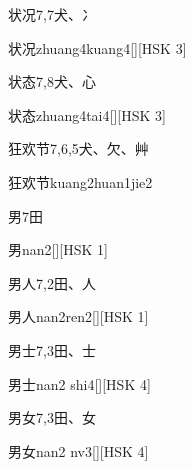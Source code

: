 \begin{entry}{状况}{7,7}{⽝、⼎}
  \begin{phonetics}{状况}{zhuang4kuang4}[][HSK 3]
  \end{phonetics}
\end{entry}

\begin{entry}{状态}{7,8}{⽝、⼼}
  \begin{phonetics}{状态}{zhuang4tai4}[][HSK 3]
  \end{phonetics}
\end{entry}

\begin{entry}{狂欢节}{7,6,5}{⽝、⽋、⾋}
  \begin{phonetics}{狂欢节}{kuang2huan1jie2}
  \end{phonetics}
\end{entry}

\begin{entry}{男}{7}{⽥}
  \begin{phonetics}{男}{nan2}[][HSK 1]
  \end{phonetics}
\end{entry}

\begin{entry}{男人}{7,2}{⽥、⼈}
  \begin{phonetics}{男人}{nan2ren2}[][HSK 1]
  \end{phonetics}
\end{entry}

\begin{entry}{男士}{7,3}{⽥、⼠}
  \begin{phonetics}{男士}{nan2 shi4}[][HSK 4]
  \end{phonetics}
\end{entry}

\begin{entry}{男女}{7,3}{⽥、⼥}
  \begin{phonetics}{男女}{nan2 nv3}[][HSK 4]
  \end{phonetics}
\end{entry}

